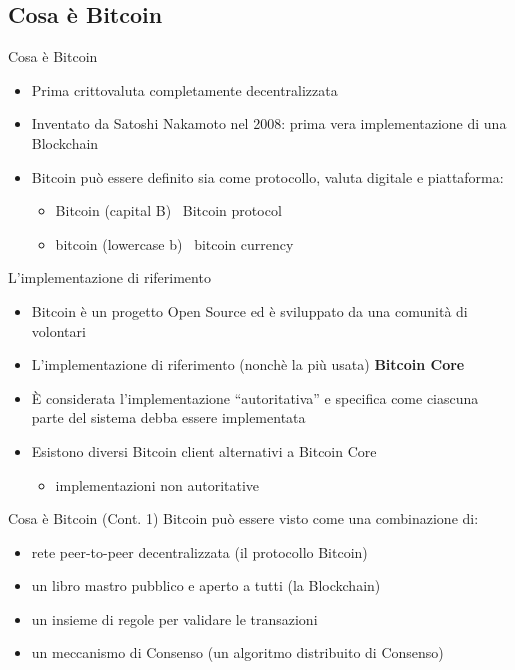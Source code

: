 \documentclass{beamer}
\begin{document}
  \subsection{Cosa è Bitcoin}
  \begin{frame}{Cosa è Bitcoin}
    \begin{itemize}
      \item Prima crittovaluta completamente decentralizzata
      \item Inventato da Satoshi Nakamoto nel 2008: prima vera implementazione di una Blockchain
      \item Bitcoin può essere definito sia come protocollo, valuta digitale e piattaforma: 
      \begin{itemize}
        \item Bitcoin (capital B)  \MVRightarrow\, Bitcoin protocol
        \item bitcoin (lowercase b) \MVRightarrow\, bitcoin  currency
      \end{itemize} \pause
    \end{itemize}

    \begin{block}{L'implementazione di riferimento}
      \begin{itemize}
        \item Bitcoin è un progetto Open Source ed è sviluppato da una comunità di volontari
        \item L'implementazione di riferimento (nonchè la più usata) \textbf{Bitcoin Core}
        \item È considerata l'implementazione ``autoritativa'' e specifica come ciascuna parte del sistema debba essere implementata
        \item Esistono diversi Bitcoin client alternativi a Bitcoin Core
        \begin{itemize}
            \item[\MVRightarrow] implementazioni non autoritative
        \end{itemize}
      \end{itemize}
    \end{block}
  \end{frame}




  \begin{frame}{Cosa è Bitcoin (Cont. 1)}
    Bitcoin può essere visto come una combinazione di: 
    \begin{itemize}
      \item rete peer-to-peer decentralizzata (il protocollo Bitcoin)
      \item un libro mastro pubblico e aperto a tutti (la Blockchain) 
      \item un insieme di regole per validare le transazioni  
      \item un meccanismo di Consenso (un algoritmo distribuito di Consenso) 
    \end{itemize}
  \end{frame}
\end{document}
